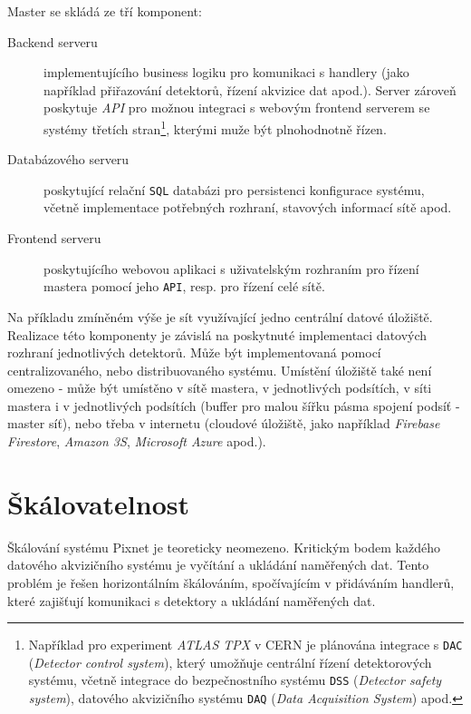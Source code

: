 Master se skládá ze tří komponent:
\begin{description}
    \item[Backend serveru] implementujícího business logiku pro komunikaci s handlery (jako například přiřazování detektorů, řízení akvizice dat apod.). Server zároveň poskytuje \textit{API} pro možnou integraci s webovým frontend serverem se systémy třetích stran\footnote{Například pro experiment \textit{ATLAS TPX} v CERN je plánována integrace s \texttt{DAC} \cite{cern_dcs} (\textit{Detector control system}), který umožňuje centrální řízení detektorových systému, včetně integrace do bezpečnostního systému \texttt{DSS} (\textit{Detector safety system}), datového akvizičního systému \texttt{DAQ} (\textit{Data Acquisition System}) apod.}, kterými muže být plnohodnotně řízen.
    \item[Databázového serveru] poskytující relační \texttt{SQL} databázi pro persistenci konfigurace systému, včetně implementace potřebných rozhraní, stavových informací sítě apod.
    \item[Frontend serveru] poskytujícího webovou aplikaci s uživatelským rozhraním pro řízení mastera pomocí jeho \texttt{API}, resp. pro řízení celé sítě.
\end{description}

Na příkladu zmíněném výše je sít využívající jedno centrální datové úložiště. Realizace této komponenty je závislá na poskytnuté implementaci datových rozhraní jednotlivých detektorů. Může být implementovaná pomocí centralizovaného, nebo distribuovaného systému. Umístění úložiště také není omezeno - může být umístěno v sítě mastera, v jednotlivých podsítích, v síti mastera i v jednotlivých podsítích (buffer pro malou šířku pásma spojení podsíť - master síť), nebo třeba v internetu (cloudové úložiště, jako například \textit{Firebase Firestore}, \textit{Amazon 3S}, \textit{Microsoft Azure} apod.).

\section{Škálovatelnost}
Škálování systému Pixnet je teoreticky neomezeno. Kritickým bodem každého datového akvizičního systému je vyčítání a ukládání naměřených dat. Tento problém je řešen horizontálním škálováním, spočívajícím v přidáváním handlerů, které zajišťují komunikaci s detektory a ukládání naměřených dat.

